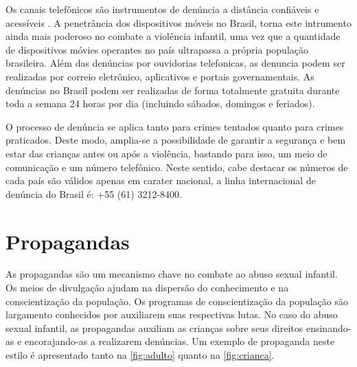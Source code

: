 Os canais telefônicos são instrumentos de denúncia a distância confiáveis e acessíveis \cite{linhas2017}. A penetrância dos dispositivos móveis no Brasil, torna este intrumento ainda mais poderoso no combate a violência infantil, uma vez que a quantidade de dispositivos móvies operantes no país ultrapassa a própria população brasileira. Além das denúncias por ouvidorias telefonicas, as denuncia podem ser realizadas por correio eletrônico, aplicativos e portais governamentais. As denúncias no Brasil podem ser realizadas de forma totalmente gratuita durante toda a semana 24 horas por dia (incluindo sábados, domingos e feriados).

O processo de denúncia se aplica tanto para crimes tentados quanto para crimes praticados. Deste modo, amplia-se a possibilidade de garantir a segurança e bem estar das crianças antes ou após a violência, bastando para isso, um meio de comunicação e um número telefônico. Neste sentido, cabe destacar os números de cada país são válidos apenas em carater nacional, a linha internacional de denúncia do Brasil é: +55 (61) 3212-8400.






\section{Propagandas}\label{sec:propagandas}

As propagandas são um mecanismo chave no combate ao abuso sexual infantil. Os meios de divulgação ajudam na dispersão do conhecimento e na conscientização da população. Os programas de conscientização da população são largamento conhecidos por auxiliarem suas respectivas lutas. %
No caso do abuso sexual infantil, as propagandas auxiliam as crianças sobre seus direitos ensinando-as e encorajando-as a realizarem denúncias. Um exemplo de propaganda neste estilo é apresentado tanto na \autoref{fig:adulto} quanto na \autoref{fig:crianca}.

